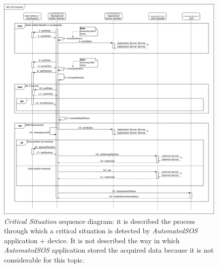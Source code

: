 \begin{figure}[H]
  \begin{center}
  	\includegraphics[width=\textwidth]{./img/sequence/criticalSituation.png}
    \hspace{0.05\linewidth}
    \centering
    \caption{\textit{Critical Situation} sequence diagram: it is described the process through which a critical situation is detected by \textit{AutomatedSOS} application + device. It is not described the way in which \textit{AutomatedSOS} application stored the acquired data because it is not considerable for this topic.}
		\label{img:criticalSituation}
    \end{center}
\end{figure}

